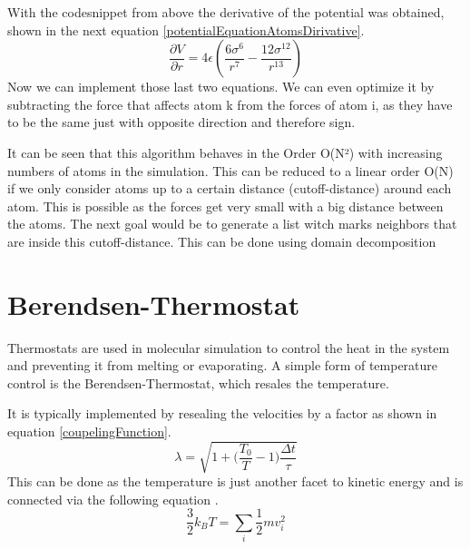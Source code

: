 With the codesnippet from above the derivative of the potential was obtained, shown in the next equation \ref{potentialEquationAtomsDirivative}.
\begin{equation}
	\label{potentialEquationAtomsDirivative}
	\frac{\partial V}{\partial r} = 4 \epsilon \left(\frac{6 \sigma^{6}}{r^{7}} - \frac{12 \sigma^{12}}{r^{13}}\right)
\end{equation}
Now we can implement those last two equations. We can even optimize it by subtracting the force that affects atom k from the forces of atom i, as they have to be the same just with opposite direction and therefore sign. 
\par 
It can be seen that this algorithm behaves in the Order O(N²) with increasing numbers of atoms in the simulation. This can be reduced to a linear order O(N) if we only consider atoms up to a certain distance (cutoff-distance) around each atom. This is possible as the forces get very small with a big distance between the atoms. The next goal would be to generate a list witch marks neighbors that are inside this cutoff-distance. This can be done using domain decomposition \cite[cf.][]{molDymCourse}
\section{Berendsen-Thermostat}
\begin{comment}
- couple the moleclular system to a larger heat bath
- thermostat controls the heat of the simulation so the system does not melt or evaporate
\end{comment}
Thermostats are used in molecular simulation to control the heat in the system and preventing it from melting or evaporating. A simple form of temperature control is the Berendsen-Thermostat, which resales the temperature. 
\par
It is typically implemented by resealing the velocities by a factor as shown in equation \ref{coupelingFunction}. 
\begin{equation}
	\label{coupelingFunction}
	\lambda = \sqrt{1 + \bigg(\frac{T_{0}}{T} -1\bigg)\frac{\Delta t}{\tau}}
\end{equation}
This can be done as the temperature is just another facet to kinetic energy and is connected via the following equation \cite[cf.][]{molDymCourse}. 
\begin{equation}
	\label{bolzmann}
	\frac{3}{2} k_{B} T = \sum_{i} \frac{1}{2} m v_{i}^2
\end{equation}

